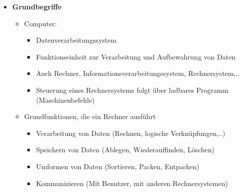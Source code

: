 \begin{itemize}
        \item \textbf{Grundbegriffe}
            \begin{itemize}
                \item Computer:
                    \begin{itemize}
                        \item Datenverarbeitungssystem
                        \item Funktionseinheit zur Verarbeitung und Aufbewahrung von Daten
                        \item Auch Rechner, Informationsverarbeitungssystem, Rechnersystem,..
                        \item Steuerung eines Rechnersystems folgt über ladbares Programm (Maschinenbefehle)
                    \end{itemize}
                \item Grundfunktionen, die ein Rechner ausführt
                    \begin{itemize}
                        \item Verarbeitung von Daten (Rechnen, logische Verknüpfungen,..)
                        \item Speichern von Daten (Ablegen, Wiederauffinden, Löschen)
                        \item Umformen von Daten (Sortieren, Packen, Entpacken)
                        \item Kommunizieren (Mit Benutzer, mit anderen Rechnersystemen)
                    \end{itemize}
            \end{itemize}


\end{itemize}
